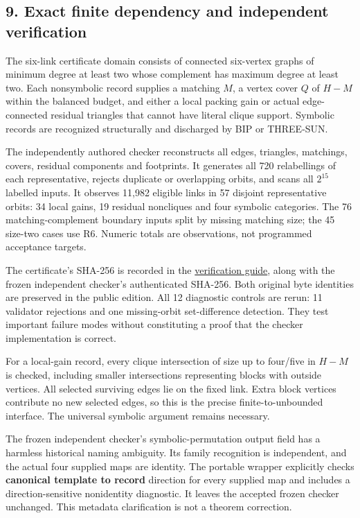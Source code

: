 \documentclass[11pt,a4paper]{article}
\begin{document}
\subsection{9. Exact finite dependency and independent verification}\label{exact-finite-dependency-and-independent-verification}

The six-link certificate domain consists of connected six-vertex graphs of minimum degree at least two whose complement has maximum degree at least two. Each nonsymbolic record supplies a matching \(M\), a vertex cover \(Q\) of \(H-M\) within the balanced budget, and either a local packing gain or actual edge-connected residual triangles that cannot have literal clique support. Symbolic records are recognized structurally and discharged by BIP or THREE-SUN.

The independently authored checker reconstructs all edges, triangles, matchings, covers, residual components and footprints. It generates all 720 relabellings of each representative, rejects duplicate or overlapping orbits, and scans all \(2^{15}\) labelled inputs. It observes 11,982 eligible links in 57 disjoint representative orbits: 34 local gains, 19 residual noncliques and four symbolic categories. The 76 matching-complement boundary inputs split by missing matching size; the 45 size-two cases use R6. Numeric totals are observations, not programmed acceptance targets.

The certificate's SHA-256 is recorded in the \href{https://github.com/pappa211/ai-math-experiments/blob/main/problems/TUZA-15/REPRODUCTION.md}{verification guide}, along with the frozen independent checker's authenticated SHA-256. Both original byte identities are preserved in the public edition. All 12 diagnostic controls are rerun: 11 validator rejections and one missing-orbit set-difference detection. They test important failure modes without constituting a proof that the checker implementation is correct.

For a local-gain record, every clique intersection of size up to four/five in \(H-M\) is checked, including smaller intersections representing blocks with outside vertices. All selected surviving edges lie on the fixed link. Extra block vertices contribute no new selected edges, so this is the precise finite-to-unbounded interface. The universal symbolic argument remains necessary.

The frozen independent checker's symbolic-permutation output field has a harmless historical naming ambiguity. Its family recognition is independent, and the actual four supplied maps are identity. The portable wrapper explicitly checks \textbf{canonical template to record} direction for every supplied map and includes a direction-sensitive nonidentity diagnostic. It leaves the accepted frozen checker unchanged. This metadata clarification is not a theorem correction.
\end{document}
